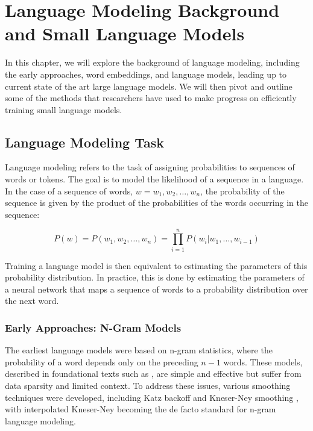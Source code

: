 \chapter{Language Modeling Background and Small Language Models}

In this chapter, we will explore the background of language modeling, including the early approaches, word embeddings, and language models, leading up to current state of the art large language models. We will then pivot and outline some of the methods that researchers have used to make progress on efficiently training small language models. 

\section{Language Modeling Task}

Language modeling refers to the task of assigning probabilities to sequences of words or tokens. The goal is to model the likelihood of a sequence in a language. In the case of a sequence of words, $w = w_1, w_2, \ldots, w_n$, the probability of the sequence is given by the product of the probabilities of the words occurring in the sequence:

\begin{equation}    
    P(w) = P(w_1, w_2, \ldots, w_n) = \prod_{i=1}^n P(w_i | w_1, \ldots, w_{i-1})
\end{equation}

Training a language model is then equivalent to estimating the parameters of this probability distribution. In practice, this is done by estimating the parameters of a neural network that maps a sequence of words to a probability distribution over the next word. 

\subsection{Early Approaches: N-Gram Models}
The earliest language models were based on n-gram statistics, where the probability of a word depends only on the preceding $n-1$ words. These models, described in foundational texts such as \cite{jurafsky2025speech}, are simple and effective but suffer from data sparsity and limited context. To address these issues, various smoothing techniques were developed, including Katz backoff \citep{katz2003estimation} and Kneser-Ney smoothing \citep{kneser1995improved}, with interpolated Kneser-Ney \citep{chen1999empirical} becoming the de facto standard for n-gram language modeling.


